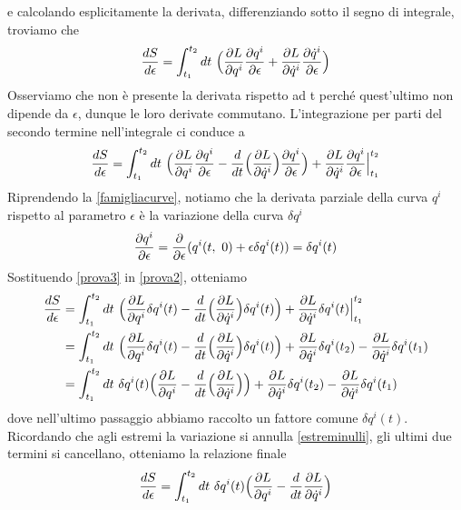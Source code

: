     e calcolando esplicitamente la derivata, differenziando sotto il segno di integrale, troviamo che 
    \begin{equation*}
        \frac{dS}{d\epsilon} = \int_{t_1}^{t_2}dt~ \Big (\frac{\partial L}{\partial q^i} \frac{\partial q^i}{\partial\epsilon} + \frac{\partial L}{\partial\dot q^i} \frac{\partial\dot q^i}{\partial\epsilon} \Big)
    \end{equation*}\label{prova1}
    Osserviamo che non è presente la derivata rispetto ad t perché quest'ultimo non dipende da $\epsilon$, dunque le loro derivate commutano. L'integrazione per parti del secondo termine nell'integrale ci conduce a
    \begin{equation}\label{prova2}
        \frac{dS}{d\epsilon} = \int_{t_1}^{t_2}dt~ \Big (\frac{\partial L}{\partial q^i} \frac{\partial q^i}{\partial\epsilon} - \frac{d}{dt} \Big (\frac{\partial L}{\partial\dot q^i} \Big) \frac{\partial q^i}{\partial\epsilon} \Big) + \frac{\partial L}{\partial\dot q^i} \frac{\partial q^i}{\partial\epsilon} \Big \vert_{t_1}^{t_2}
    \end{equation}
    Riprendendo la \eqref{famigliacurve}, notiamo che la derivata parziale della curva $q^i$ rispetto al parametro $\epsilon$ è la variazione della curva $\delta q^i$
    \begin{equation}\label{prova3}
        \frac{\partial q^i}{\partial\epsilon} = \frac{\partial}{\partial\epsilon} (q^i(t, ~ 0) + \epsilon \delta q^i(t)) = \delta q^i(t)
    \end{equation}
    Sostituendo \eqref{prova3} in \eqref{prova2}, otteniamo 
    \begin{equation*}
    \begin{aligned}
        \frac{dS}{d\epsilon} & = \int_{t_1}^{t_2}dt~ \Big (\frac{\partial L}{\partial q^i} \delta q^i(t) - \frac{d}{dt} \Big (\frac{\partial L}{\partial\dot q^i} \Big) \delta q^i(t) \Big) + \frac{\partial L}{\partial\dot q^i} \delta q^i(t) \Big \vert_{t_1}^{t_2} \\  & = \int_{t_1}^{t_2}dt~ \Big (\frac{\partial L}{\partial q^i} \delta q^i(t) - \frac{d}{dt} \Big (\frac{\partial L}{\partial\dot q^i} \Big) \delta q^i(t) \Big) + \frac{\partial L}{\partial\dot q^i} \delta q^i(t_2) - \frac{\partial L}{\partial\dot q^i} \delta q^i(t_1) \\ & = \int_{t_1}^{t_2}dt~ \delta q^i(t) \Big (\frac{\partial L}{\partial q^i}  - \frac{d}{dt} \Big (\frac{\partial L}{\partial\dot q^i} \Big) \Big) + \frac{\partial L}{\partial\dot q^i} \delta q^i(t_2) - \frac{\partial L}{\partial\dot q^i} \delta q^i(t_1)
    \end{aligned}
    \end{equation*}
    dove nell'ultimo passaggio abbiamo raccolto un fattore comune $\delta q^i(t)$. Ricordando che agli estremi la variazione si annulla \eqref{estreminulli}, gli ultimi due termini si cancellano, otteniamo la relazione finale
    \begin{equation} \label{prova4}
        \frac{dS}{d\epsilon} = \int_{t_1}^{t_2}dt~ \delta q^i(t) \Big (\frac{\partial L}{\partial q^i}  - \frac{d}{dt} \frac{\partial L}{\partial\dot q^i} \Big)
    \end{equation}
